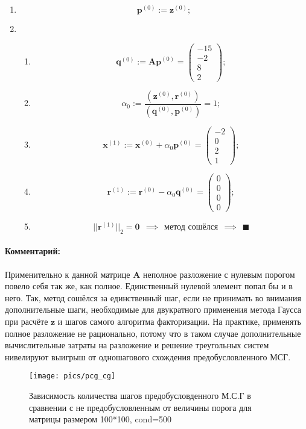 \begin{enumerate}
    \item $$\mathbf{p}^{(0)} := \mathbf{z}^{(0)};$$

    \item \begin{enumerate}
        \item $$\mathbf{q}^{(0)} :=
        \mathbf{Ap}^{(0)} = \begin{pmatrix} -15\\ -2\\ 8\\ 2 \end{pmatrix};$$

        \item $$\alpha_0 :=
        \dfrac{(\mathbf{z}^{(0)}, \mathbf{r}^{(0)})}{(\mathbf{q}^{(0)}, \mathbf{p}^{(0)})} = 1;$$

        \item $$\mathbf{x}^{(1)} :=
        \mathbf{x}^{(0)}+\alpha_0\mathbf{p}^{(0)} = \begin{pmatrix} -2\\ 0\\ 2\\ 1 \end{pmatrix};$$

         \item $$\mathbf{r}^{(1)} :=
        \mathbf{r}^{(0)}-\alpha_0\mathbf{q}^{(0)} = \begin{pmatrix} 0\\ 0\\ 0 \\ 0 \end{pmatrix};$$

        \item $$||\mathbf{r}^{(1)}||_2 = \mathbf{0} ~~\implies ~~ \text{метод сошёлся} ~~\implies ~~ \blacksquare$$
    \end{enumerate}
\end{enumerate}

\paragraph{Комментарий:} Применительно к данной матрице $\mathbf{A}$ неполное разложение с нулевым порогом повело себя так же, как полное. Единственный нулевой элемент попал бы и в него. Так, метод сошёлся за единственный шаг, если не принимать во внимания дополнительные шаги, необходимые для двукратного применения метода Гаусса при расчёте $\mathbf{z}$ и шагов самого алгоритма факторизации. На практике, применять полное разложение не рационально, потому что в таком случае дополнительные вычислительные затраты на разложение и решение треугольных систем нивелируют выигрыш от одношагового схождения предобусловленного МСГ.

\begin{figure}[H]
    \centering
    \texttt{[image: pics/pcg\_cg]}
    \caption{Зависимость количества шагов предобусловденного М.С.Г в сравнении с не предобусловленным от величины порога для матрицы размером 100*100, cond=500}
    \label{fig:pcgcg}
\end{figure}
